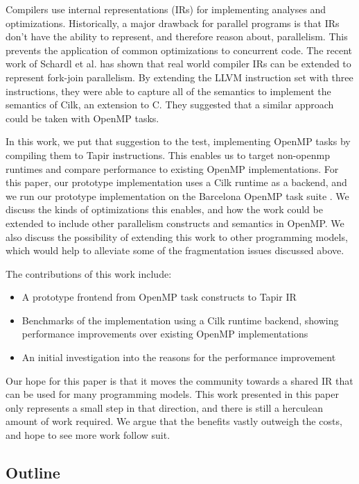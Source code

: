 \documentclass[sigconf]{acmart}
\begin{document}
Compilers use internal representations (IRs) for implementing analyses and
optimizations. Historically, a major drawback for parallel programs is that IRs
don't have the ability to represent, and therefore reason about, parallelism.
This prevents the application of common optimizations to concurrent code. The
recent work of Schardl et al.  \cite{shardl2017} has shown that real world
compiler IRs can be extended to represent fork-join parallelism. By extending
the LLVM instruction set with three instructions, they were able to capture all
of the semantics to implement the semantics of Cilk, an extension to C. They
suggested that a similar approach could be taken with OpenMP tasks.

In this work, we put that suggestion to the test, implementing OpenMP tasks by
compiling them to Tapir instructions. This enables us to target non-openmp
runtimes and compare performance to existing OpenMP implementations. For this
paper, our prototype implementation uses a Cilk runtime as a backend, and we run
our prototype implementation on the Barcelona OpenMP task suite
\cite{barcelona}. We discuss the kinds of optimizations this enables, and how
the work could be extended to include other parallelism constructs and semantics
in OpenMP. We also discuss the possibility of extending this work to other
programming models, which would help to alleviate some of the fragmentation
issues discussed above.

The contributions of this work include: 

\begin{itemize}
\item A prototype frontend from OpenMP task constructs to Tapir IR
\item Benchmarks of the implementation using a Cilk runtime backend, showing
performance improvements over existing OpenMP implementations
\item An initial investigation into the reasons for the performance improvement
\end{itemize}

Our hope for this paper is that it moves the community towards a shared IR that
can be used for many programming models. This work presented in this paper only
represents a small step in that direction, and there is still a herculean amount
of work required. We argue that the benefits vastly outweigh the costs, and
hope to see more work follow suit. 

\subsection{Outline}
\end{document}
